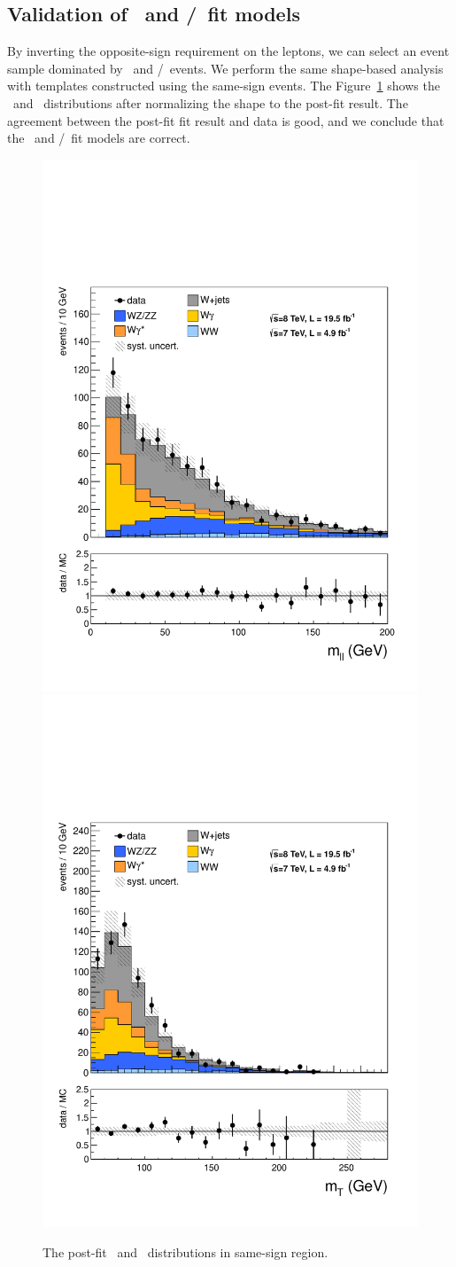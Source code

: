 \subsection{Validation of \Wjets\ and \wgamma/\wgammastar\ fit models}  

By inverting the opposite-sign requirement on the leptons, 
we can select an event sample dominated by \Wjets\ and \wgamma/\wgammastar\ events. 
We perform the same shape-based analysis
with templates constructed using the same-sign events.
The Figure~\ref{fig:ssCRfit} shows the \mll\ and \mT\ distributions
after normalizing the shape to the post-fit result. The agreement
between the post-fit fit result and data is good, and we conclude
that the \Wjets\ and \wgamma/\wgammastar\ fit models are correct.

\begin{figure}[!hbtp] 
\begin{center}
    \includegraphics[width=.47\textwidth]{figures/SS_mll_0j.pdf}
    \includegraphics[width=.47\textwidth]{figures/SS_mT_0j.pdf}
    \caption{The post-fit \mll\ and \mT\ distributions in same-sign region.} 
    \label{fig:ssCRfit}
\end{center}
\end{figure}



